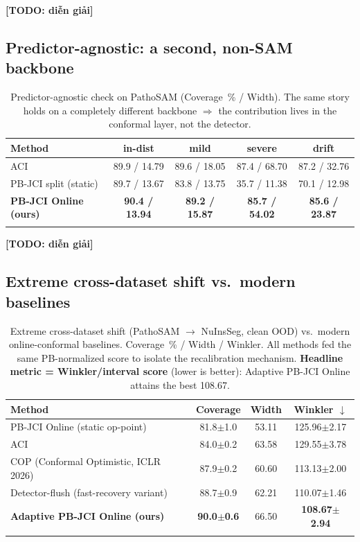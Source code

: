 \documentclass[pdflatex,sn-mathphys,Numbered]{sn-jnl}
\theoremstyle{remark}
\begin{document}
\textbf{[TODO: diễn giải]}

\subsection{Predictor-agnostic: a second, non-SAM backbone}\label{sec:agnostic}

\begin{table}[t]
\caption{Predictor-agnostic check on PathoSAM (Coverage~\% / Width). The same
story holds on a completely different backbone $\Rightarrow$ the contribution
lives in the conformal layer, not the detector.}
\label{tab:agnostic}
\begin{tabular}{@{}lcccc@{}}
\toprule
Method & in-dist & mild & severe & drift \\
\midrule
ACI                           & 89.9 / 14.79 & 89.6 / 18.05 & 87.4 / 68.70 & 87.2 / 32.76 \\
PB-JCI split (static)         & 89.7 / 13.67 & 83.8 / 13.75 & 35.7 / 11.38 & 70.1 / 12.98 \\
\textbf{PB-JCI Online (ours)} & \textbf{90.4 / 13.94} & \textbf{89.2 / 15.87} & \textbf{85.7 / 54.02} & \textbf{85.6 / 23.87} \\
\botrule
\end{tabular}
\end{table}

\textbf{[TODO: diễn giải]}

\subsection{Extreme cross-dataset shift vs.\ modern baselines}\label{sec:cross}

\begin{table}[t]
\caption{Extreme cross-dataset shift (PathoSAM $\to$ NuInsSeg, clean OOD) vs.\
modern online-conformal baselines. Coverage~\% / Width / Winkler. All methods
fed the same PB-normalized score to isolate the recalibration mechanism.
\textbf{Headline metric = Winkler/interval score} (lower is better):
Adaptive PB-JCI Online attains the best 108.67.}
\label{tab:cross}
\begin{tabular}{@{}lccc@{}}
\toprule
Method & Coverage & Width & Winkler $\downarrow$ \\
\midrule
PB-JCI Online (static op-point)        & 81.8$\pm$1.0 & 53.11 & 125.96$\pm$2.17 \\
ACI                                    & 84.0$\pm$0.2 & 63.58 & 129.55$\pm$3.78 \\
COP (Conformal Optimistic, ICLR 2026)  & 87.9$\pm$0.2 & 60.60 & 113.13$\pm$2.00 \\
Detector-flush (fast-recovery variant) & 88.7$\pm$0.9 & 62.21 & 110.07$\pm$1.46 \\
\textbf{Adaptive PB-JCI Online (ours)} & \textbf{90.0$\pm$0.6} & 66.50 & \textbf{108.67$\pm$2.94} \\
\botrule
\end{tabular}
\end{table}
\end{document}
